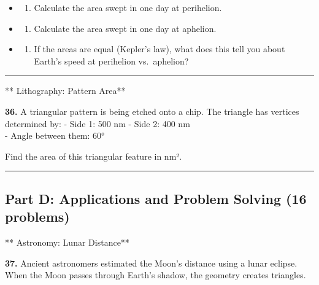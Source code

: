 \documentclass[
  11pt,
]{article}
\providecommand{\tightlist}{%
  \setlength{\itemsep}{0pt}\setlength{\parskip}{0pt}}
\begin{document}
\begin{itemize}
\item
  \begin{enumerate}
  \def\labelenumi{(\alph{enumi})}
  \tightlist
  \item
    Calculate the area swept in one day at perihelion.
  \end{enumerate}
\item
  \begin{enumerate}
  \def\labelenumi{(\alph{enumi})}
  \setcounter{enumi}{1}
  \tightlist
  \item
    Calculate the area swept in one day at aphelion.
  \end{enumerate}
\item
  \begin{enumerate}
  \def\labelenumi{(\alph{enumi})}
  \setcounter{enumi}{2}
  \tightlist
  \item
    If the areas are equal (Kepler's law), what does this tell you about
    Earth's speed at perihelion vs.~aphelion?
  \end{enumerate}
\end{itemize}

\begin{center}\rule{0.5\linewidth}{0.5pt}\end{center}

** Lithography: Pattern Area**

\textbf{36.} A triangular pattern is being etched onto a chip. The
triangle has vertices determined by: - Side 1: 500 nm - Side 2: 400 nm\\
- Angle between them: 60°

Find the area of this triangular feature in nm².

\begin{center}\rule{0.5\linewidth}{0.5pt}\end{center}

\hypertarget{part-d-applications-and-problem-solving-16-problems}{%
\subsection{Part D: Applications and Problem Solving (16
problems)}\label{part-d-applications-and-problem-solving-16-problems}}

** Astronomy: Lunar Distance**

\textbf{37.} Ancient astronomers estimated the Moon's distance using a
lunar eclipse. When the Moon passes through Earth's shadow, the geometry
creates triangles.
\end{document}
